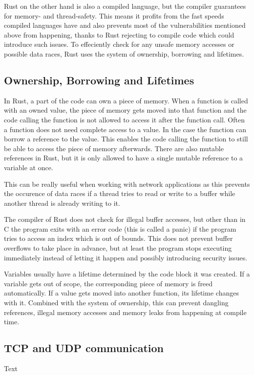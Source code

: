 Rust on the other hand is also a compiled language, but the compiler guarantees for memory- and thread-safety. This
means it profits from the fast speeds compiled languages have and also prevents most of the vulnerabilities mentioned
above from happening, thanks to Rust rejecting to compile code which could introduce such issues. To effeciently check
for any unsafe memory accesses or possible data races, Rust uses the system of ownership, borrowing and lifetimes.

\subsection{Ownership, Borrowing and Lifetimes}
In Rust, a part of the code can own a piece of memory. When a function is called with an owned value, the piece of
memory gets moved into that function and the code calling the function is not allowed to access it after the function
call. Often a function does not need complete access to a value. In the case the function can borrow a reference to the
value. This enables the code calling the function to still be able to access the piece of memory afterwards.
There are also mutable references in Rust, but it is only allowed to have a single mutable reference to a variable at
once.

This can be really useful when working with network applications as this prevents the occurence of data races if a
thread tries to read or write to a buffer while another thread is already writing to it.

The compiler of Rust does not check for illegal buffer accesses, but other than in C the program exits with an error
code (this is called a panic) if the program tries to access an index which is out of bounds. This does not prevent
buffer overflows to take place in advance, but at least the program stops executing immediately instead of letting it
happen and possibly introducing security issues.

Variables usually have a lifetime determined by the code block it was created. If a variable gets out of scope, the
corresponding piece of memory is freed automatically. If a value gets moved into another function, its lifetime changes
with it. Combined with the system of ownership, this can prevent dangling references, illegal memory accesses and
memory leaks from happening at compile time. \cite{c15safe}

\subsection{TCP and UDP communication}
Text
